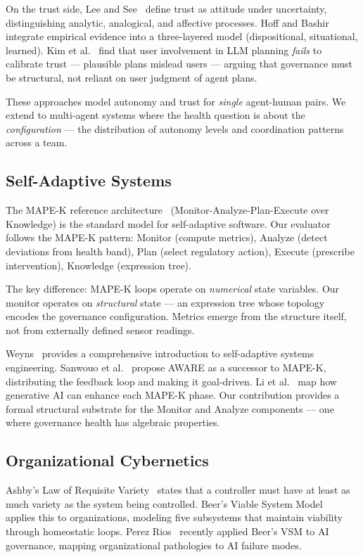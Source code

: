 \documentclass[sigconf,nonacm]{acmart}
\begin{document}
On the trust side, Lee and See~\cite{leesee} define trust as attitude
under uncertainty, distinguishing analytic, analogical, and affective
processes. Hoff and Bashir~\cite{hoffbashir} integrate empirical evidence
into a three-layered model (dispositional, situational, learned). Kim et
al.~\cite{kim} find that user involvement in LLM planning \emph{fails}
to calibrate trust --- plausible plans mislead users --- arguing that
governance must be structural, not reliant on user judgment of agent plans.

These approaches model autonomy and trust for \emph{single} agent-human
pairs. We extend to multi-agent systems where the health question is
about the \emph{configuration} --- the distribution of autonomy levels
and coordination patterns across a team.

\subsection{Self-Adaptive Systems}

The MAPE-K reference architecture~\cite{mapek} (Monitor-Analyze-Plan-Execute
over Knowledge) is the standard model for self-adaptive software. Our
evaluator follows the MAPE-K pattern: Monitor (compute metrics), Analyze
(detect deviations from health band), Plan (select regulatory action),
Execute (prescribe intervention), Knowledge (expression tree).

The key difference: MAPE-K loops operate on \emph{numerical} state
variables. Our monitor operates on \emph{structural} state --- an
expression tree whose topology encodes the governance configuration.
Metrics emerge from the structure itself, not from externally defined
sensor readings.

Weyns~\cite{weyns} provides a comprehensive introduction to self-adaptive
systems engineering. Sanwouo et al.~\cite{aware} propose AWARE as a
successor to MAPE-K, distributing the feedback loop and making it
goal-driven. Li et al.~\cite{ligen} map how generative AI can enhance
each MAPE-K phase. Our contribution provides a formal structural substrate
for the Monitor and Analyze components --- one where governance health has
algebraic properties.

\subsection{Organizational Cybernetics}

Ashby's Law of Requisite Variety~\cite{ashby} states that a controller
must have at least as much variety as the system being controlled. Beer's
Viable System Model~\cite{beer} applies this to organizations, modeling
five subsystems that maintain viability through homeostatic loops. Perez
Rios~\cite{perezrios} recently applied Beer's VSM to AI governance,
mapping organizational pathologies to AI failure modes.
\end{document}
